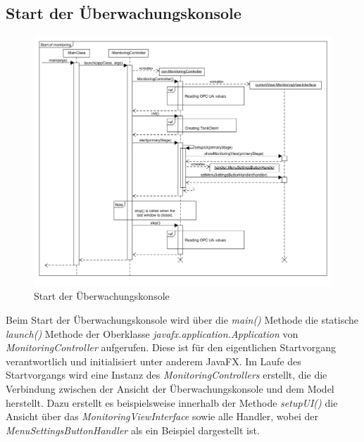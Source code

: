 \documentclass[parskip=full]{scrartcl}
\begin{document}
\subsection{Start der Überwachungskonsole}
\begin{figure}[H]
	\centering
	\includegraphics[scale=0.4]{design/sequence-diagrams/start-of-monitoring.png}
	\caption{Start der Überwachungskonsole}
\end{figure}
Beim Start der Überwachungskonsole wird über die \emph{main()} Methode die statische \emph{launch()} Methode der Oberklasse \emph{javafx.application.Application} von \emph{MonitoringController} aufgerufen. Diese ist für den eigentlichen Startvorgang verantwortlich und initialisiert unter anderem JavaFX.
Im Laufe des Startvorgangs wird eine Instanz des \emph{MonitoringControllers} erstellt, die die Verbindung zwischen der Ansicht der Überwachungskonsole und dem Model herstellt. Dazu erstellt es beispielsweise innerhalb der Methode \emph{setupUI()} die Ansicht über das \emph{MonitoringViewInterface} sowie alle Handler, wobei der \emph{MenuSettingsButtonHandler} als ein Beispiel dargestellt ist.
\end{document}
